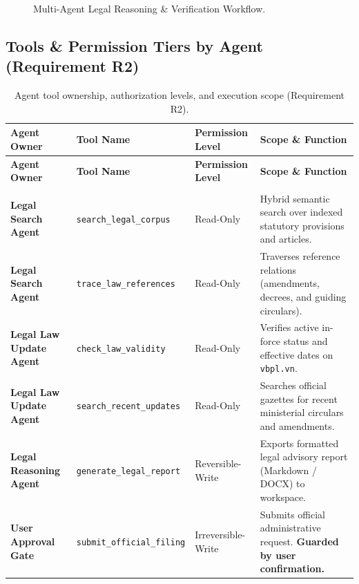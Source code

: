 \begin{figure}[htbp]
\caption{Multi-Agent Legal Reasoning \& Verification Workflow.}
\label{fig:agent-workflow}
\end{figure}

\subsection{Tools \& Permission Tiers by Agent (Requirement R2)}

\begingroup
\small
\begin{longtable}{>{\raggedright\arraybackslash}p{} >{\raggedright\arraybackslash}p{} >{\raggedright\arraybackslash}p{} >{\raggedright\arraybackslash}p{}}
\caption{Agent tool ownership, authorization levels, and execution scope (Requirement R2).}
\label{tab:mcp-tools} \\
\toprule
\textbf{Agent Owner} & \textbf{Tool Name} & \textbf{Permission Level} & \textbf{Scope \& Function} \\
\midrule
\endfirsthead
\toprule
\textbf{Agent Owner} & \textbf{Tool Name} & \textbf{Permission Level} & \textbf{Scope \& Function} \\
\midrule
\endhead
\midrule
\multicolumn{4}{r}{\small\itshape Continued on next page} \\
\endfoot
\bottomrule
\endlastfoot

\textbf{Legal Search Agent} & \texttt{search\_legal\_corpus} & Read-Only & Hybrid semantic search over indexed statutory provisions and articles. \\ \addlinespace
\textbf{Legal Search Agent} & \texttt{trace\_law\_references}& Read-Only & Traverses reference relations (amendments, decrees, and guiding circulars). \\ \addlinespace
\textbf{Legal Law Update Agent}& \texttt{check\_law\_validity} & Read-Only & Verifies active in-force status and effective dates on \texttt{vbpl.vn}. \\ \addlinespace
\textbf{Legal Law Update Agent}& \texttt{search\_recent\_updates}& Read-Only & Searches official gazettes for recent ministerial circulars and amendments. \\ \addlinespace
\textbf{Legal Reasoning Agent}& \texttt{generate\_legal\_report}& Reversible-Write & Exports formatted legal advisory report (Markdown / DOCX) to workspace. \\ \addlinespace
\textbf{User Approval Gate}   & \texttt{submit\_official\_filing}& Irreversible-Write & Submits official administrative request. \textbf{Guarded by user confirmation.} \\
\end{longtable}
\endgroup

